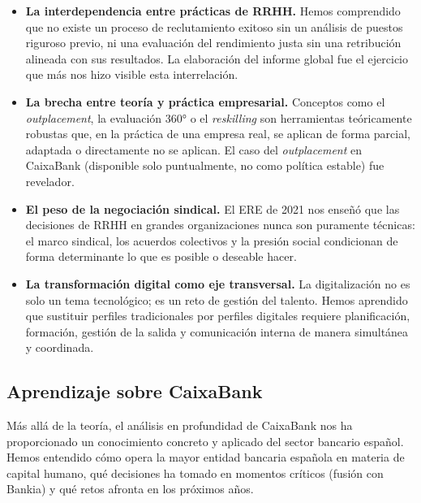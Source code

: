 \begin{itemize}
  \item \textbf{La interdependencia entre prácticas de RRHH.}
        Hemos comprendido que no existe un proceso de reclutamiento exitoso
        sin un análisis de puestos riguroso previo, ni una evaluación del
        rendimiento justa sin una retribución alineada con sus resultados.
        La elaboración del informe global fue el ejercicio que más nos hizo
        visible esta interrelación.

  \item \textbf{La brecha entre teoría y práctica empresarial.}
        Conceptos como el \textit{outplacement}, la evaluación 360° o el
        \textit{reskilling} son herramientas teóricamente robustas que, en
        la práctica de una empresa real, se aplican de forma parcial,
        adaptada o directamente no se aplican. El caso del \textit{outplacement}
        en CaixaBank (disponible solo puntualmente, no como política estable)
        fue revelador.

  \item \textbf{El peso de la negociación sindical.}
        El ERE de 2021 nos enseñó que las decisiones de RRHH en grandes
        organizaciones nunca son puramente técnicas: el marco sindical,
        los acuerdos colectivos y la presión social condicionan de forma
        determinante lo que es posible o deseable hacer.

  \item \textbf{La transformación digital como eje transversal.}
        La digitalización no es solo un tema tecnológico; es un reto de
        gestión del talento. Hemos aprendido que sustituir perfiles
        tradicionales por perfiles digitales requiere planificación,
        formación, gestión de la salida y comunicación interna de manera
        simultánea y coordinada.
\end{itemize}

\subsection{Aprendizaje sobre CaixaBank}

Más allá de la teoría, el análisis en profundidad de CaixaBank nos ha
proporcionado un conocimiento concreto y aplicado del sector bancario español.
Hemos entendido cómo opera la mayor entidad bancaria española en materia de
capital humano, qué decisiones ha tomado en momentos críticos (fusión con Bankia)
y qué retos afronta en los próximos años.

